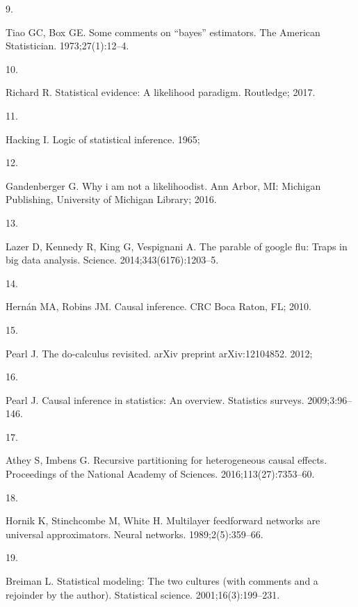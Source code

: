 \documentclass[
  10pt,
]{scrbook}
\newlength{\cslhangindent}
\newlength{\csllabelwidth}
\newlength{\cslentryspacingunit} %
\newenvironment{CSLReferences}[2] %
 {%
  \setlength{\parindent}{0pt}
  \ifodd #1
  \let\oldpar\par
  \def\par{\hangindent=\cslhangindent\oldpar}
  \fi
  \setlength{\parskip}{#2\cslentryspacingunit}
 }%
 {}
\newcommand{\CSLLeftMargin}[1]{\parbox[t]{\csllabelwidth}{#1}}
\newcommand{\CSLRightInline}[1]{\parbox[t]{\linewidth - \csllabelwidth}{#1}\break}
\begin{document}
\begin{CSLReferences}{0}{0}
\leavevmode{}%
\CSLLeftMargin{9. }
\CSLRightInline{Tiao GC, Box GE. Some comments on {``bayes''} estimators. The American Statistician. 1973;27(1):12--4. }

\leavevmode{}%
\CSLLeftMargin{10. }
\CSLRightInline{Richard R. Statistical evidence: A likelihood paradigm. Routledge; 2017. }

\leavevmode{}%
\CSLLeftMargin{11. }
\CSLRightInline{Hacking I. Logic of statistical inference. 1965; }

\leavevmode{}%
\CSLLeftMargin{12. }
\CSLRightInline{Gandenberger G. Why i am not a likelihoodist. Ann Arbor, MI: Michigan Publishing, University of Michigan Library; 2016. }

\leavevmode{}%
\CSLLeftMargin{13. }
\CSLRightInline{Lazer D, Kennedy R, King G, Vespignani A. The parable of google flu: Traps in big data analysis. Science. 2014;343(6176):1203--5. }

\leavevmode{}%
\CSLLeftMargin{14. }
\CSLRightInline{Hernán MA, Robins JM. Causal inference. CRC Boca Raton, FL; 2010. }

\leavevmode{}%
\CSLLeftMargin{15. }
\CSLRightInline{Pearl J. The do-calculus revisited. arXiv preprint arXiv:12104852. 2012; }

\leavevmode{}%
\CSLLeftMargin{16. }
\CSLRightInline{Pearl J. Causal inference in statistics: An overview. Statistics surveys. 2009;3:96--146. }

\leavevmode{}%
\CSLLeftMargin{17. }
\CSLRightInline{Athey S, Imbens G. Recursive partitioning for heterogeneous causal effects. Proceedings of the National Academy of Sciences. 2016;113(27):7353--60. }

\leavevmode{}%
\CSLLeftMargin{18. }
\CSLRightInline{Hornik K, Stinchcombe M, White H. Multilayer feedforward networks are universal approximators. Neural networks. 1989;2(5):359--66. }

\leavevmode{}%
\CSLLeftMargin{19. }
\CSLRightInline{Breiman L. Statistical modeling: The two cultures (with comments and a rejoinder by the author). Statistical science. 2001;16(3):199--231. }


\end{CSLReferences}
\end{document}
